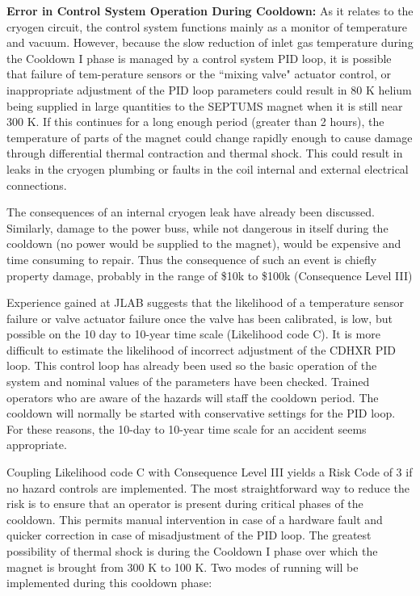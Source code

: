 {\bf Error in Control System Operation During Cooldown:}
As it relates to the cryogen circuit, the control system functions mainly as a monitor of temperature and 
vacuum.  However, because the slow reduction of inlet gas temperature during the Cooldown I phase is managed 
by a control system PID loop, it is possible that failure of tem-perature sensors or the ``mixing valve" 
actuator control, or inappropriate adjustment of the PID loop parameters could result in 80 K helium being 
supplied in large quantities to the SEPTUMS magnet when it is still near 300 K.  If this continues for a 
long enough period (greater than 2 hours), the temperature of parts of the magnet could change rapidly 
enough to cause damage through differential thermal contraction and thermal shock.  This could result in 
leaks in the cryogen plumbing or faults in the coil internal and external electrical connections.

The consequences of an internal cryogen leak have already been discussed.  Similarly, 
damage to the power buss, while not dangerous in itself during the cooldown (no power would be supplied 
to the magnet), would be expensive and time consuming to repair.  Thus the consequence of such an event 
is chiefly property damage, probably in the range of \$10k to \$100k (Consequence Level III)

Experience gained at JLAB suggests that the likelihood of a temperature sensor failure or valve actuator 
failure once the valve has been calibrated, is low, but possible on the 10 day to 10-year time scale 
(Likelihood code C).  It is more difficult to estimate the likelihood of incorrect adjustment of the CDHXR 
PID loop.  This control loop has already been used so the basic operation of the system and nominal 
values of the parameters have been checked.  Trained operators who are aware of the hazards will staff 
the cooldown period.  The cooldown will normally be started with conservative settings for the PID loop.  
For these reasons, the 10-day to 10-year time scale for an accident seems appropriate.

Coupling Likelihood code C with Consequence Level III yields a Risk Code of 3 if no hazard controls are 
implemented.  The most straightforward way to reduce the risk is to ensure that an operator is present 
during critical phases of the cooldown. This permits manual intervention in case of a hardware fault and 
quicker correction in case of misadjustment of the PID loop.  The greatest possibility of thermal shock 
is during the Cooldown I phase over which the magnet is brought from 300 K to 100 K.  Two modes of running 
will be implemented during this cooldown phase:

